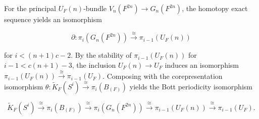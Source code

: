 For the principal $U_F(n)$-bundle $V_n(F^{2n}) \rightarrow G_n(F^{2n})$, the homotopy exact sequence yields an isomorphism

$$\partial: \pi_i(G_n(F^{2n})) \xrightarrow{\cong} \pi_{i-1}(U_F(n))$$

for $i < (n+1)c-2$. By the stability of $\pi_{i-1}(U_F(n))$ for $i-1 < c(n+1)-3$, the inclusion $U_F(n) \rightarrow U_F$ induces an isomorphism $\pi_{i-1}(U_F(n)) \xrightarrow{\cong} \pi_{i-1}(U_F)$. Composing with the corepresentation isomorphism $\theta: \tilde{K}_F(S^i) \xrightarrow{\cong} \pi_i(B_{(F)})$ yields the Bott periodicity isomorphism

$$\tilde{K}_F(S^i) \xrightarrow{\cong} \pi_i(B_{(F)}) \xrightarrow{\cong} \pi_i(G_n(F^{2n})) \xrightarrow{\cong} \pi_{i-1}(U_F(n)) \xrightarrow{\cong} \pi_{i-1}(U_F).$$
